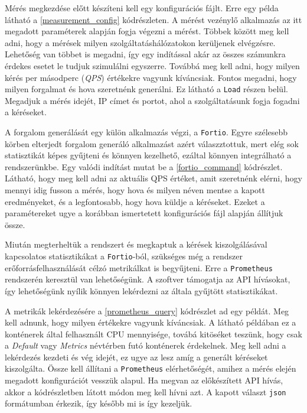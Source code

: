 Mérés megkezdése előtt készíteni kell egy konfigurációs fájlt. Erre egy példa látható a \ref{measurement_config} kódrészleten. A mérést vezénylő alkalmazás az itt megadott paraméterek alapján fogja végezni a mérést. Többek között meg kell adni, hogy a mérések milyen szolgáltatáshálózatokon kerüljenek elvégzésre. Lehetőség van többet is megadni, így egy indítással akár az összes számunkra érdekes esetet le tudjuk szimulálni egyszerre. Továbbá meg kell adni, hogy milyen kérés per másodperc (\textit{QPS}) értékekre vagyunk kíváncsiak. Fontos megadni, hogy milyen forgalmat és hova szeretnénk generálni. Ez látható a \verb+Load+ részen belül. Megadjuk a mérés idejét, IP címet és portot, ahol a szolgáltatásunk fogja fogadni a kéréseket.\\


\lstset{caption=Mérés konfigurációja, label=measurement_config}


A forgalom generálását egy külön alkalmazás végzi, a \verb+Fortio+. Egyre szélesebb körben elterjedt forgalom generáló alkalmazást azért válaszztottuk, mert elég sok statisztikát képes gyűjteni és könnyen kezelhető, ezáltal könnyen integrálható a rendszerünkbe. Egy valódi indítást mutat be a  \ref{fortio_command} kódrészlet. 
Látható, hogy meg kell adni az aktuális QPS értéket, amit szeretnénk elérni, hogy mennyi idig fusson a mérés, hogy hova és milyen néven mentse a kapott eredményeket, és a legfontosabb, hogy hova küldje a kéréseket.
Ezeket a paramétereket ugye a korábban ismertetett konfigurációs fájl alapján állítjuk össze. \\



Miután megterheltük a rendszert és megkaptuk a kérések kiszolgálásával kapcsolatos statisztikákat a \verb+Fortio+-ból, szükséges még a rendszer erőforrásfelhasználását célzó metrikálkat is begyűjteni. 
Erre a \verb+Prometheus+ rendszerén keresztül van lehetőségünk.
A szoftver támogatja az API hívásokat, így lehetőségünk nyílik könnyen lekérdezni az általa gyűjtött statisztikákat. 

A metrikák lekérdezésére a \ref{prometheus_query} kódrészlet ad egy példát. Meg kell adnunk, hogy milyen értékekre vagyunk kíváncsiak. A látható példában ez a konténerek által felhasznált CPU mennyisége, továbá kitöséket teszünk, hogy csak a \textit{Default} vagy \textit{Metrics} névtérben futó konténerek érdekelnek.
Meg kell adni a lekérdezés kezdeti és vég idejét, ez ugye az lesz amíg a generált kéréseket kiszolgálta.
Össze kell állítani a \verb+Prometheus+ elérhetőségét, amihez a mérés elején megadott konfigurációt vesszük alapul. Ha megvan az előkészített API hívás, akkor a kódrészletben látott módon meg kell hívni azt. A kapott választ \verb+json+ formátumban érkezik, így később mi is így kezeljük. \\


